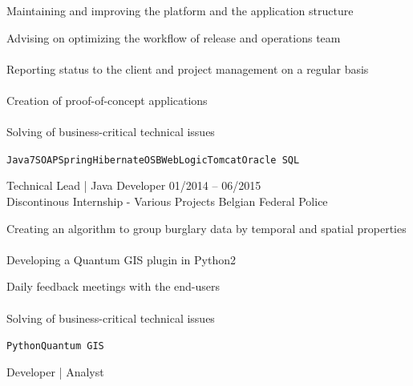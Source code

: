 \documentclass[9pt, blue, square]{developercv} %
\begin{document}
\begin{entrylist}
{\begin{minipage}[t]{0.40\textwidth}
				\itemmarker Maintaining and improving the platform and the application structure\\
			\end{minipage}
			\hfill
			\begin{minipage}[t]{0.40\textwidth} %
				\vspace{-\baselineskip}
				\itemmarker Advising on optimizing the workflow of release and operations team\\
				\vspace{-3mm}\\
				\itemmarker Reporting status to the client and project management on a regular basis\\
				\vspace{-3mm}\\
				\itemmarker Creation of proof-of-concept applications\\
				\vspace{-3mm}\\
				\itemmarker Solving of business-critical technical issues
			\end{minipage}
			\vspace{-5mm}
			\textcolor{text!65}{\texttt{Java7}\slashsep\texttt{SOAP}\slashsep\texttt{Spring}\slashsep\texttt{Hibernate}\slashsep\texttt{OSB}\slashsep\texttt{WebLogic}\slashsep\texttt{Tomcat}\slashsep\texttt{Oracle SQL}}}
		{Technical Lead \textcolor{text!65}{|} Java Developer}
		\entry
		{01/2014 -- 06/2015\\\small{Discontinous}}
		{Internship - Various Projects}
		{Belgian Federal Police}
		{
			\vspace{0.2cm}
			\begin{minipage}[t]{0.40\textwidth} %
				\vspace{-\baselineskip}
				\itemmarker Creating an algorithm to group burglary data by temporal and spatial properties\\
				\vspace{-3mm}\\
				\itemmarker Developing a Quantum GIS plugin in Python2\\
			\end{minipage}
			\hfill
			\begin{minipage}[t]{0.40\textwidth} %
				\vspace{-\baselineskip}
				\itemmarker Daily feedback meetings with the end-users\\
				\vspace{-3mm}\\
				\itemmarker Solving of business-critical technical issues
			\end{minipage}
			\vspace{-5mm}
			\textcolor{text!65}{\texttt{Python}\slashsep\texttt{Quantum GIS}}
		}
		{Developer \textcolor{text!65}{|} Analyst}
	\end{entrylist}
	
\end{document}
